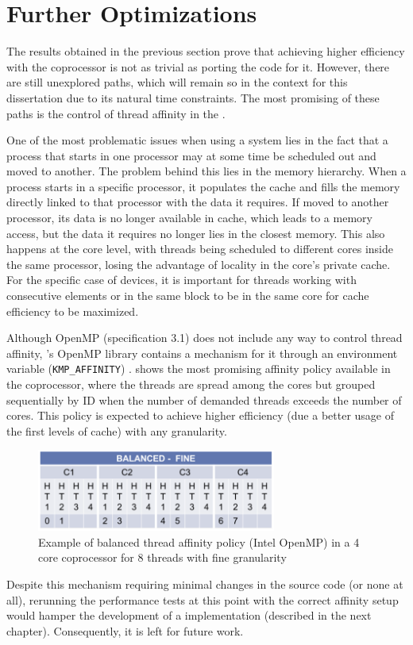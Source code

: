 \documentclass[../thesis]{subfiles}
\begin{document}
	\section{Further Optimizations}
	\label{sec:mic:further}

	The results obtained in the previous section prove that achieving higher efficiency with the coprocessor is not as trivial as porting the code for it. However, there are still unexplored paths, which will remain so in the context for this dissertation due to its natural time constraints. The most promising of these paths is the control of thread affinity in the \intel\xeonphi.

	One of the most problematic issues when using a \numa system lies in the fact that a process that starts in one processor may at some time be scheduled out and moved to another. The problem behind this lies in the memory hierarchy. When a process starts in a specific processor, it populates the cache and fills the memory directly linked to that processor with the data it requires. If moved to another processor, its data is no longer available in cache, which leads to a memory access, but the data it requires no longer lies in the closest memory. This also happens at the core level, with threads being scheduled to different cores inside the same processor, losing the advantage of locality in the core's private cache. For the specific case of \intel\mic devices, it is important for threads working with consecutive elements or in the same block to be in the same core for cache efficiency to be maximized.

	Although OpenMP (specification 3.1) does not include any way to control thread affinity, \intel's OpenMP library contains a mechanism for it through an environment variable (\texttt{KMP\_AFFINITY}) \cite{PRACE:MIC:BestPracticeGuide,CESGA:MIC:Evaluation}.  shows the most promising affinity policy available in the coprocessor, where the threads are spread among the cores but grouped sequentially by ID when the number of demanded threads exceeds the number of cores. This policy is expected to achieve higher efficiency (due a better usage of the first levels of cache) with any granularity.

	\begin{figure}
		\begin{center}
			\includegraphics[width=0.7\textwidth]{assets/images/kmp_affinity_balanced.png}
		\end{center}
		\caption[Example of balanced thread affinity policy in (Intel OpenMP)]{Example of balanced thread affinity policy (Intel OpenMP) in a 4 core coprocessor for 8 threads with fine granularity}
		\label{fig:kmp_affinity:balanced}
	\end{figure}

	Despite this mechanism requiring minimal changes in the source code (or none at all), rerunning the performance tests at this point with the correct affinity setup would hamper the development of a \cuda implementation (described in the next chapter). Consequently, it is left for future work.
\end{document}
